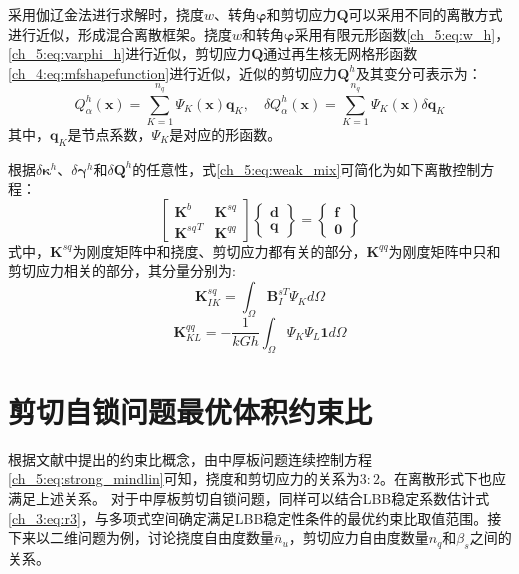 采用伽辽金法进行求解时，挠度$w$、转角$\boldsymbol{\varphi}$和剪切应力$\boldsymbol{Q}$可以采用不同的离散方式进行近似，形成混合离散框架。挠度$w$和转角$\boldsymbol{\varphi}$采用有限元形函数\eqref{ch_5:eq:w_h}，\eqref{ch_5:eq:varphi_h}进行近似，剪切应力$\boldsymbol{Q}$通过再生核无网格形函数\eqref{ch_4:eq:mfshapefunction}进行近似，近似的剪切应力$\boldsymbol{Q}^h$及其变分可表示为：
\begin{equation}\label{ch_5:eq:Q_h}
    Q^h_\alpha(\boldsymbol x) = \sum_{K=1}^{n_q} \Psi_K(\boldsymbol x) \boldsymbol{q}_{K},\quad \delta Q^h_\alpha(\boldsymbol x) = \sum_{K=1}^{n_q} \Psi_K(\boldsymbol x) \delta \boldsymbol{q}_{ K}
\end{equation}
其中，$\boldsymbol{q}_{ K}$是节点系数，$\Psi_K$是对应的形函数。

根据$\delta\boldsymbol\kappa^h$、$\delta\boldsymbol\gamma^h$和$\delta\boldsymbol Q^h$的任意性，式\eqref{ch_5:eq:weak_mix}可简化为如下离散控制方程：
\begin{equation} \label{equilibrium_mindlin_mix}
    \begin{bmatrix}\boldsymbol{K}^{b}&\boldsymbol{K}^{sq}\\{\boldsymbol{K}^{sq}}^T&\boldsymbol{K}^{qq}\end{bmatrix}
    \begin{Bmatrix}\boldsymbol{d}\\\boldsymbol{q}\end{Bmatrix}=
    \begin{Bmatrix}\boldsymbol{f}\\\boldsymbol{0}\end{Bmatrix}
\end{equation}
式中，$\boldsymbol K^{sq}$为刚度矩阵中和挠度、剪切应力都有关的部分，$\boldsymbol K^{qq}$为刚度矩阵中只和剪切应力相关的部分，其分量分别为:
\begin{equation} 
    \boldsymbol K^{sq}_{IK} = \int_\Omega \boldsymbol B^{sT}_I \Psi_K d\Omega
\end{equation} 
\begin{equation} 
    \boldsymbol K^{qq}_{KL} = -\frac{1}{kGh} \int_\Omega \Psi_K \Psi_L \boldsymbol 1 d\Omega
\end{equation}

\section{剪切自锁问题最优体积约束比}

根据文献{\cite{hughes2000}}中提出的约束比概念，由中厚板问题连续控制方程\eqref{ch_5:eq:strong_mindlin}可知，挠度和剪切应力的关系为$3:2$。在离散形式下也应满足上述关系。
对于中厚板剪切自锁问题，同样可以结合LBB稳定系数估计式\eqref{ch_3:eq:r3}，与多项式空间确定满足LBB稳定性条件的最优约束比取值范围。接下来以二维问题为例，讨论挠度自由度数量$\bar{n}_u$，剪切应力自由度数量$n_q$和$\beta_s$之间的关系。

